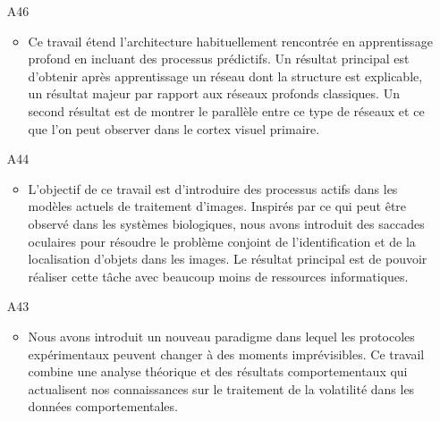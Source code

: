 \begin{enumerate}
\item[A46] %
\begin{itemize}
  \item Ce travail étend l'architecture habituellement rencontrée en apprentissage profond en incluant des processus prédictifs. Un résultat principal est d'obtenir après apprentissage un réseau dont la structure est explicable, un résultat majeur par rapport aux réseaux profonds classiques. Un second résultat est de montrer le parallèle entre ce type de réseaux et ce que l'on peut observer dans le cortex visuel primaire.
\end{itemize}
%

\item[A44]  %
\begin{itemize}
  \item L'objectif de ce travail est d'introduire des processus actifs dans les modèles actuels de traitement d'images. Inspirés par ce qui peut être observé dans les systèmes biologiques, nous avons introduit des saccades oculaires pour résoudre le problème conjoint de l'identification et de la localisation d'objets dans les images. Le résultat principal est de pouvoir réaliser cette tâche avec beaucoup moins de ressources informatiques.
\end{itemize}

\item[A43] %
\begin{itemize}
  \item Nous avons introduit un nouveau paradigme dans lequel les protocoles expérimentaux peuvent changer à des moments imprévisibles. Ce travail combine une analyse théorique et des résultats comportementaux qui actualisent nos connaissances sur le traitement de la volatilité dans les données comportementales.
\end{itemize}

%
%
%
%


\end{enumerate}
